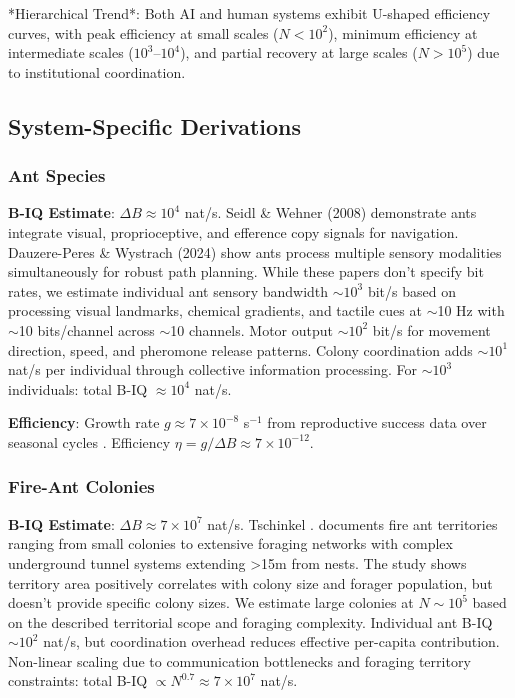 \documentclass[10pt,conference]{IEEEtran}
\begin{document}
*Hierarchical Trend*: Both AI and human systems exhibit U-shaped efficiency curves, with peak efficiency at small scales ($N<10^2$), minimum efficiency at intermediate scales ($10^3$--$10^4$), and partial recovery at large scales ($N>10^5$) due to institutional coordination.

\subsection{System-Specific Derivations}
\label{sec:derivations}

\subsubsection{Ant Species}
\textbf{B-IQ Estimate}: $\Delta B \approx 10^4$ nat/s. Seidl \& Wehner (2008) demonstrate ants integrate visual, proprioceptive, and efference copy signals for navigation. Dauzere-Peres \& Wystrach (2024) show ants process multiple sensory modalities simultaneously for robust path planning. While these papers don't specify bit rates, we estimate individual ant sensory bandwidth $\sim10^3$ bit/s based on processing visual landmarks, chemical gradients, and tactile cues at $\sim$10 Hz with $\sim$10 bits/channel across $\sim$10 channels. Motor output $\sim10^2$ bit/s for movement direction, speed, and pheromone release patterns. Colony coordination \cite{gordon2020} adds $\sim10^1$ nat/s per individual through collective information processing. For $\sim10^3$ individuals: total B-IQ $\approx 10^4$ nat/s.

\textbf{Efficiency}: Growth rate $g \approx 7 \times 10^{-8}$ s$^{-1}$ from reproductive success data over seasonal cycles \cite{ant_nest_rate}. Efficiency $\eta = g/\Delta B \approx 7 \times 10^{-12}$.

\subsubsection{Fire-Ant Colonies}
\textbf{B-IQ Estimate}: $\Delta B \approx 7 \times 10^7$ nat/s. Tschinkel \cite{tschinkel2011}. documents fire ant territories ranging from small colonies to extensive foraging networks with complex underground tunnel systems extending >15m from nests. The study shows territory area positively correlates with colony size and forager population, but doesn't provide specific colony sizes. We estimate large colonies at $N \sim 10^5$ based on the described territorial scope and foraging complexity. Individual ant B-IQ $\sim 10^2$ nat/s, but coordination overhead reduces effective per-capita contribution. Non-linear scaling due to communication bottlenecks and foraging territory constraints: total B-IQ $\propto N^{0.7} \approx 7 \times 10^7$ nat/s.
\end{document}
